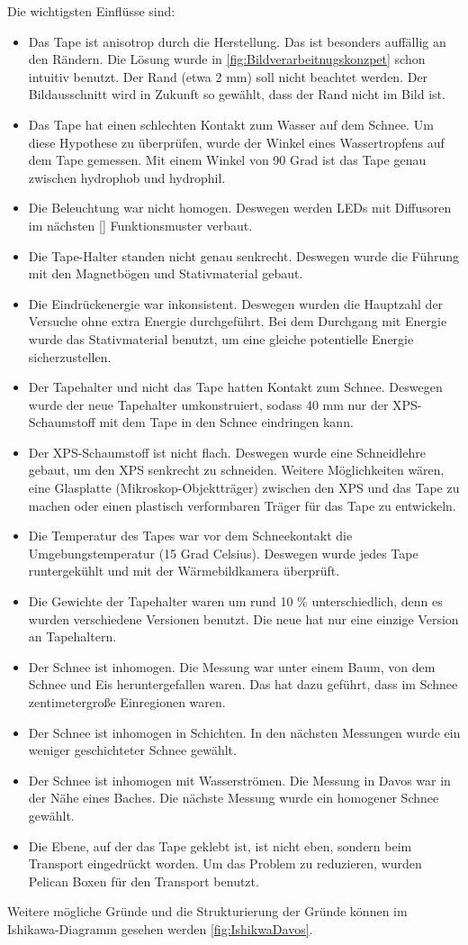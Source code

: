 Die wichtigsten Einflüsse sind:
\begin{itemize}
\item Das Tape ist anisotrop durch die Herstellung. Das ist besonders auffällig an den Rändern. Die Lösung wurde in \ref{fig:Bildverarbeitnugskonzpet} schon intuitiv benutzt. Der Rand (etwa 2 mm) soll nicht beachtet werden. Der Bildausschnitt wird in Zukunft so gewählt, dass der Rand nicht im Bild ist.
\item Das Tape hat einen schlechten Kontakt zum Wasser auf dem Schnee. Um diese Hypothese zu überprüfen, wurde der Winkel eines Wassertropfens auf dem Tape gemessen. Mit einem Winkel von 90 Grad ist das Tape genau zwischen hydrophob und hydrophil.
\item Die Beleuchtung war nicht homogen. Deswegen werden LEDs mit Diffusoren im nächsten \ref{} Funktionsmuster verbaut.
\item Die Tape-Halter standen nicht genau senkrecht. Deswegen wurde die Führung mit den Magnetbögen und Stativmaterial gebaut.
\item Die Eindrückenergie war inkonsistent. Deswegen wurden die Hauptzahl der Versuche ohne extra Energie durchgeführt. Bei dem Durchgang mit Energie wurde das Stativmaterial benutzt, um eine gleiche potentielle Energie sicherzustellen.
\item Der Tapehalter und nicht das Tape hatten Kontakt zum Schnee. Deswegen wurde der neue Tapehalter umkonstruiert, sodass 40 mm nur der XPS-Schaumstoff mit dem Tape in den Schnee eindringen kann.
\item Der XPS-Schaumstoff ist nicht flach. Deswegen wurde eine Schneidlehre gebaut, um den XPS senkrecht zu schneiden. Weitere Möglichkeiten wären, eine Glasplatte (Mikroskop-Objektträger) zwischen den XPS und das Tape zu machen oder einen plastisch verformbaren Träger für das Tape zu entwickeln.
\item Die Temperatur des Tapes war vor dem Schneekontakt die Umgebungstemperatur (15 Grad Celsius). Deswegen wurde jedes Tape runtergekühlt und mit der Wärmebildkamera überprüft.
\item Die Gewichte der Tapehalter waren um rund 10 \% unterschiedlich, denn es wurden verschiedene Versionen benutzt. Die neue hat nur eine einzige Version an Tapehaltern.
\item Der Schnee ist inhomogen. Die Messung war unter einem Baum, von dem Schnee und Eis heruntergefallen waren. Das hat dazu geführt, dass im Schnee zentimetergroße Einregionen waren.
\item Der Schnee ist inhomogen in Schichten. In den nächsten Messungen wurde ein weniger geschichteter Schnee gewählt.
\item Der Schnee ist inhomogen mit Wasserströmen. Die Messung in Davos war in der Nähe eines Baches. Die nächste Messung wurde ein homogener Schnee gewählt.
\item Die Ebene, auf der das Tape geklebt ist, ist nicht eben, sondern beim Transport eingedrückt worden. Um das Problem zu reduzieren, wurden Pelican Boxen für den Transport benutzt.
\end{itemize}

Weitere mögliche Gründe und die Strukturierung der Gründe können im Ishikawa-Diagramm gesehen werden \ref{fig:IshikwaDavos}.


